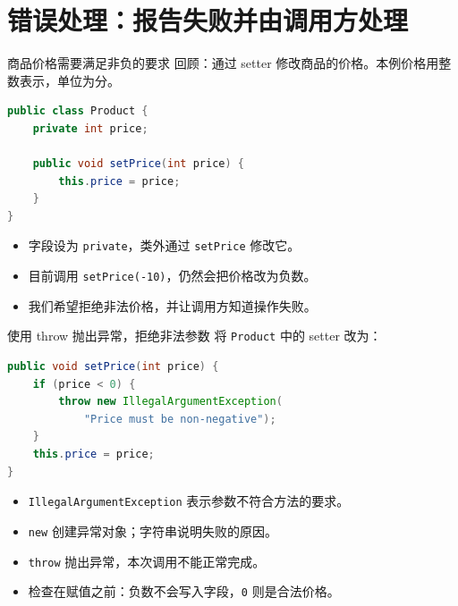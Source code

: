 \documentclass[aspectratio=169]{beamer}
\begin{document}
\section{错误处理：报告失败并由调用方处理}

\begin{frame}[fragile]{商品价格需要满足非负的要求}
  回顾：通过 setter 修改商品的价格。本例价格用整数表示，单位为分。
  \begin{lstlisting}[language=Java]
public class Product {
    private int price;

    public void setPrice(int price) {
        this.price = price;
    }
}
  \end{lstlisting}
  \begin{itemize}
    \item 字段设为 \texttt{private}，类外通过 \texttt{setPrice} 修改它。
    \item 目前调用 \texttt{setPrice(-10)}，仍然会把价格改为负数。
    \item 我们希望\alert{拒绝非法价格，并让调用方知道操作失败}。
  \end{itemize}
\end{frame}

\begin{frame}[fragile]{使用 throw 抛出异常，拒绝非法参数}
  将 \texttt{Product} 中的 setter 改为：
  \begin{lstlisting}[language=Java]
public void setPrice(int price) {
    if (price < 0) {
        throw new IllegalArgumentException(
            "Price must be non-negative");
    }
    this.price = price;
}
  \end{lstlisting}
  \begin{itemize}
    \item \texttt{IllegalArgumentException} 表示参数不符合方法的要求。
    \item \texttt{new} 创建异常对象；字符串说明失败的原因。
    \item \texttt{throw} 抛出异常，本次调用不能正常完成。
    \item 检查在赋值之前：负数不会写入字段，\texttt{0} 则是合法价格。
  \end{itemize}
\end{frame}
\end{document}
